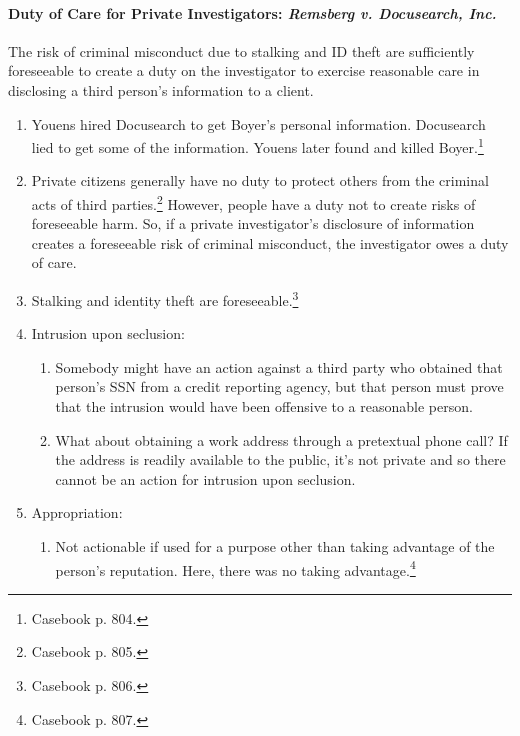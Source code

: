 \paragraph{Duty of Care for Private Investigators: \emph{Remsberg v. Docusearch, 
Inc.}}

The risk of criminal misconduct due to stalking and ID theft are sufficiently 
foreseeable to create a duty on the investigator to exercise reasonable care in 
disclosing a third person's information to a client.

\begin{enumerate}
    \item Youens hired Docusearch to get Boyer's personal information. 
    Docusearch lied to get some of the information. Youens later found and 
    killed Boyer.\footnote{Casebook p. 804.}
    \item Private citizens generally have no duty to protect others from the 
    criminal acts of third parties.\footnote{Casebook p. 805.} However, people 
    have a duty not to create risks of foreseeable harm. So, if a private 
    investigator's disclosure of information creates a foreseeable risk of 
    criminal misconduct, the investigator owes a duty of care.
    \item Stalking and identity theft are foreseeable.\footnote{Casebook p. 
    806.}
    \item Intrusion upon seclusion:
    \begin{enumerate}
        \item Somebody might have an action against a third party who obtained 
        that person's SSN from a credit reporting agency, but that person must 
        prove that the intrusion would have been offensive to a reasonable 
        person.
        \item What about obtaining a work address through a pretextual phone 
        call? If the address is readily available to the public, it's not 
        private and so there cannot be an action for intrusion upon seclusion.
    \end{enumerate}
    \item Appropriation:
    \begin{enumerate}
        \item Not actionable if used for a purpose other than taking advantage 
        of the person's reputation. Here, there was no taking 
        advantage.\footnote{Casebook p. 807.}
    \end{enumerate}
\end{enumerate}

